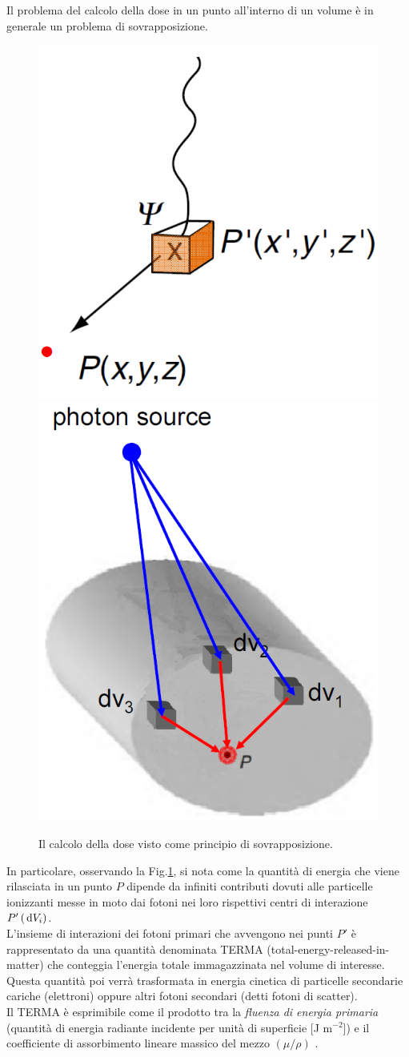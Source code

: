 {Il problema del calcolo della dose in un punto all'interno di un volume è in generale un problema di sovrapposizione.
\begin{figure}
\centering
\includegraphics[width=.45\textwidth]{./cap1/superp1.png}
\includegraphics[width=.45\textwidth]{./cap1/superp2.png}
\caption{Il calcolo della dose visto come principio di sovrapposizione.}
\label{fig:superp}
\end{figure}
In particolare, osservando la Fig.\ref{fig:superp}, si nota come la quantità di energia che viene rilasciata in un punto $P$ dipende da infiniti contributi dovuti alle particelle ionizzanti messe in moto dai fotoni nei loro rispettivi centri di interazione $P'\,(\,\text{d} V_i)$.\\
L'insieme di interazioni dei fotoni primari che avvengono nei punti $P'$ è rappresentato da una quantità denominata TERMA (total-energy-released-in-matter) che conteggia l'energia totale immagazzinata nel volume di interesse. Questa quantità poi verrà trasformata in energia cinetica di particelle secondarie cariche (elettroni) oppure altri fotoni secondari (detti fotoni di scatter).\\
Il TERMA è esprimibile come il prodotto tra la \textit{fluenza di energia primaria} (quantità di energia radiante incidente per unità di superficie [J m$^{-2}$]) e il coefficiente di assorbimento lineare massico del mezzo $(\mu/\rho)$ \cite{Ahnesjo1987}.

}
